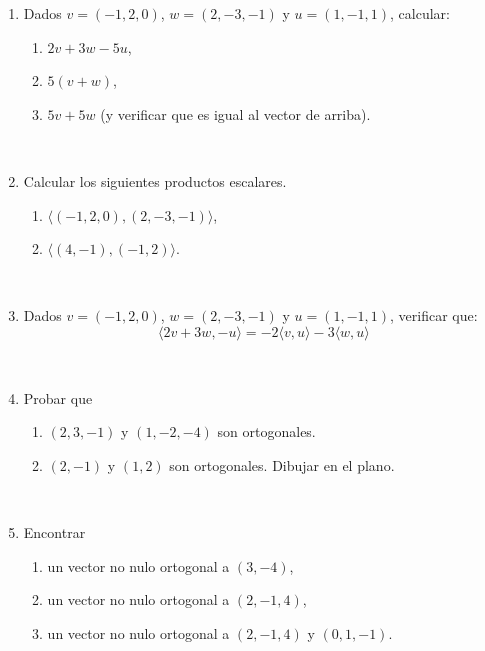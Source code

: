 \documentclass[12pt]{amsart}
\begin{document}
\begin{enumerate}


\item Dados $v = (-1, 2, 0)$, $w = (2,-3,-1)$ y $u = (1,-1,1)$, calcular:
\begin{enumerate}
	\item $2v + 3w -5u$,
	\item $5(v+w)$,
	\item $5v + 5w$ (y verificar que es igual al vector de arriba).
\end{enumerate}

\

\item Calcular los siguientes productos escalares. %
\begin{enumerate}
  \item $\langle (-1, 2, 0) ,(2,-3,-1) \rangle$,
  \item  $\langle (4,-1),(-1,2) \rangle$.
\end{enumerate}

\

\item Dados $v = (-1, 2, 0)$, $w = (2,-3,-1)$  y $u = (1,-1,1)$, verificar que:
\begin{equation*}
	\langle 2v + 3w , -u   \rangle = -2\langle v ,u \rangle -3 \langle w , u  \rangle
\end{equation*}

\

\item Probar  que
\begin{enumerate}
	\item $(2,3,-1)$ y $(1, -2, -4)$ son ortogonales.
	\item $(2,-1)$ y $(1,2)$ son ortogonales. Dibujar en el plano.
\end{enumerate}
\

\item Encontrar
\begin{enumerate}
	\item un vector no nulo ortogonal  a $(3,-4)$,
	\item un vector no nulo ortogonal a $(2,-1,4)$,
	\item un vector no nulo ortogonal a $(2,-1,4)$ y $(0,1,-1)$.
\end{enumerate}


\end{enumerate}
\end{document}
